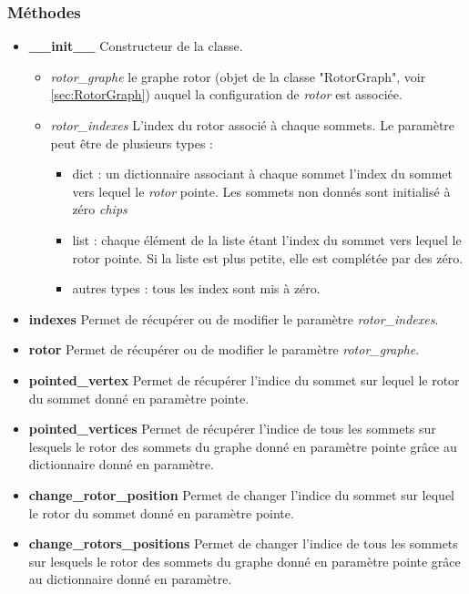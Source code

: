 \documentclass{article}
\begin{document}
	\subsubsection{Méthodes}
	\begin{itemize}
		\item \textbf{\_\_init\_\_}\newline
		Constructeur de la classe.
		\begin{itemize}
		    \item \textit{rotor\_graphe}\newline
		    le graphe rotor (objet de la classe "RotorGraph", voir \ref{sec:RotorGraph}) auquel la configuration de \textit{rotor} est associée.
		    \item \textit{rotor\_indexes}\newline
		    L'index du rotor associé à chaque sommets. Le paramètre peut être de plusieurs types :
		    \begin{itemize}
		        \item dict : un dictionnaire associant à chaque sommet l'index du sommet vers lequel le \textit{rotor} pointe. Les sommets non donnés sont initialisé à zéro \textit{chips}
				\item list : chaque élément de la liste étant l'index du sommet vers lequel le rotor pointe. Si la liste est plus petite, elle est complétée par des zéro.
				\item autres types : tous les index sont mis à zéro.
		    \end{itemize}
		\end{itemize}
	    \item \textbf{indexes}\newline
    	Permet de récupérer ou de modifier le paramètre \textit{rotor\_indexes}.
    	\item \textbf{rotor}\newline
    	Permet de récupérer ou de modifier le paramètre \textit{rotor\_graphe}.
    	\item \textbf{pointed\_vertex}\newline
    	Permet de récupérer l'indice du sommet sur lequel le rotor du sommet donné en paramètre pointe.
    	\item \textbf{pointed\_vertices}\newline
    	Permet de récupérer l'indice de tous les sommets sur lesquels le rotor des sommets du graphe donné en paramètre pointe grâce au dictionnaire donné en paramètre.
    	\item \textbf{change\_rotor\_position}\newline
    	Permet de changer l'indice du sommet sur lequel le rotor du sommet donné en paramètre pointe.
    	\item \textbf{change\_rotors\_positions}\newline
    	Permet de changer l'indice de tous les sommets sur lesquels le rotor des sommets du graphe donné en paramètre pointe grâce au dictionnaire donné en paramètre.
	\end{itemize}
\end{document}
